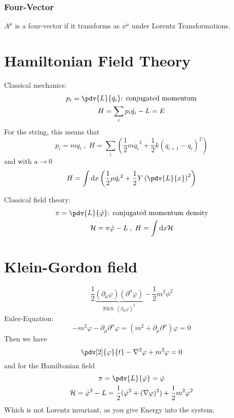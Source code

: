 \documentclass[]{scrartcl}
\begin{document}
\subsubsection{Four-Vector}
$A^\mu$ is a four-vector if it transforms as $x^\mu$ under Lorentz Transformations.

\section{Hamiltonian Field Theory}

Classical mechanics:
\begin{gather}
	p_i = \pdv{L}{\dot{q_i}}\text{: conjugated momentum}\\
	H = \sum_i p_i\dot{q_i} - L = E
\end{gather}
For the string, this means that
\begin{equation}
	p_i = m\dot{q_i}\;,\; H = \sum_i \left(\frac{1}{2}m\dot{q_i}^2 + \frac{1}{2}k(q_{i+1} - q_i)^2\right)
\end{equation}
and with $a\rightarrow 0$
\begin{equation}
	H = \int\text d x \left(\frac{1}{2}\mu\dot{q_i}^2 + \frac{1}{2}Y\left(\pdv{L}{x}\right)^2\right)
\end{equation}

Classical field theory:
\begin{gather}
	\pi = \pdv{L}{\dot\varphi}\text{: conjugated momentum density}\\
	\mathcal{H} = \pi\dot\varphi - L\;,\; H = \int \text d x \mathcal{H}
\end{gather}

\section{Klein-Gordon field}

\begin{equation}
	\frac{1}{2}\underbrace{(\partial_\mu \varphi)(\partial^\mu\varphi)}_{\text{P\&S: } (\partial_\mu\varphi)^2} - \frac{1}{2}m^2\phi^2
\end{equation}
Euler-Equation:
\begin{equation}
	-m^2\varphi - \partial_\mu\partial^\mu \varphi = (m^2 + \partial_\mu\partial^\mu)\varphi = 0
\end{equation}
Then we have
\begin{equation}
	\pdv[2]{\varphi}{t} - \nabla^2\varphi + m^2\varphi = 0
\end{equation}
and for the Hamiltonian field
\begin{gather}
	\pi = \pdv{L}{\dot\varphi} = \dot\varphi\\
	\mathcal{H} = \dot\varphi^2 - L = \frac{1}{2}(\dot\varphi^2 + (\nabla\varphi)^2) + \frac{1}{2}m^2\varphi^2
\end{gather}
Which is not Lorentz invariant, as you give Energy into the system.
\end{document}
